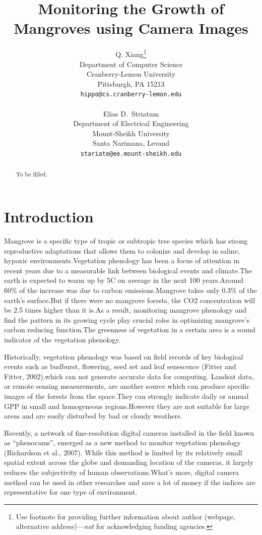 \documentclass{article}
\title{Monitoring the Growth of Mangroves using Camera Images}
\author{
  Q. Xiang\thanks{Use footnote for providing further
    information about author (webpage, alternative
    address)---\emph{not} for acknowledging funding agencies.} \\
  Department of Computer Science\\
  Cranberry-Lemon University\\
  Pittsburgh, PA 15213 \\
  \texttt{hippo@cs.cranberry-lemon.edu} \\
   
   \And
   
 Elias D.~Striatum \\
  Department of Electrical Engineering\\
  Mount-Sheikh University\\
  Santa Narimana, Levand \\
  \texttt{stariate@ee.mount-sheikh.edu} \\
}
\begin{document}
\maketitle

\begin{abstract}
To be filled.
\end{abstract}







\section{Introduction}

Mangrove is a specific type of tropic or subtropic tree species which has strong
reproductive adaptations that allows them to colonize and develop in saline, hypoxic
environments.Vegetation phenology has been a focus of attention in recent years due
to a measurable link between biological events and climate.The earth is expected to
warm up by 5\°C on average in the next 100 years.Around 60\% of the increase was
due to carbon emissions.Mangrove takes only 0.3\% of the earth’s surface.But if there
were no mangrove forests, the CO2 concentration will be 2.5 times higher than it
is.As a result, monitoring mangrove phenology and find the pattern in its growing
cycle play crucial roles in optimizing mangrove’s carbon reducing function.The
greenness of vegetation in a certain area is a sound indicator of the vegetation
phenology.

Historically, vegetation phenology was based on field records of key biological
events such as budburst, flowering, seed set and leaf senescence (Fitter and Fitter,
2002),which can not generate accurate data for computing. Landsat data, or remote
sensing measurements, are another source which can produce specific images of the
forests from the space.They can strongly indicate daily or annual GPP in small and
homogeneous regions.However they are not suitable for large areas and are easily
disturbed by bad or cloudy weathers.

Recently, a network of fine-resolution digital cameras installed in the field known as
“phenocams”, emerged as a new method to monitor vegetation phenology
(Richardson et al., 2007). While this method is limited by its relatively small spatial
extent across the globe and demanding location of the cameras, it largely reduces the
subjectivity of human observations.What’s more, digital camera method can be used
in other researches and save a lot of money if the indices are representative for one
type of environment.
\end{document}
